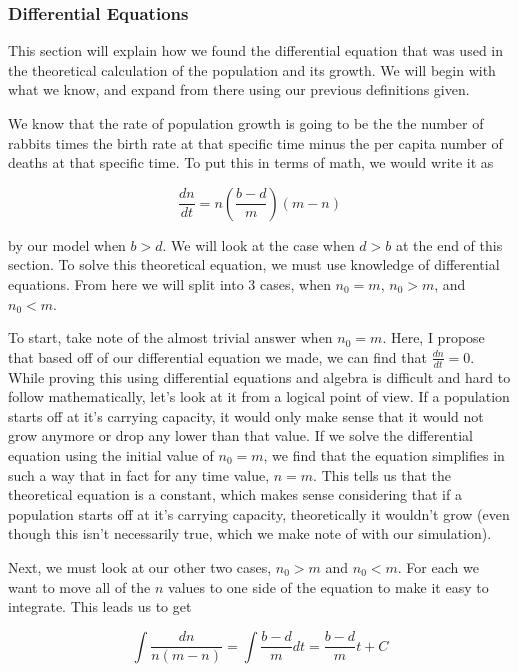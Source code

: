 \documentclass{article}\usepackage[]{graphicx}\usepackage[]{color}
\begin{document}
\subsubsection{Differential Equations}

This section will explain how we found the differential equation that was used in the theoretical calculation of the population and its growth. We will begin with what we know, and expand from there using our previous definitions given.

We know that the rate of population growth is going to be the the number of rabbits times the birth rate at that specific time minus the per capita number of deaths at that specific time. To put this in terms of math, we would write it as

\begin{equation}
\frac{dn}{dt} = n\left(\frac{b-d}{m}\right)(m-n) 
\end{equation}

\noindent by our model when \(b > d\). We will look at the case when \(d > b\) at the end of this section. To solve this theoretical equation, we must use knowledge of differential equations. From here we will split into 3 cases, when \(n_0 =m\), \(n_0 > m\), and \(n_0 < m\). 

To start, take note of the almost trivial answer when \(n_0 = m\). Here, I propose that based off of our differential equation we made, we can find that \(\frac{dn}{dt} = 0\). While proving this using differential equations and algebra is difficult and hard to follow mathematically, let's look at it from a logical point of view. If a population starts off at it's carrying capacity, it would only make sense that it would not grow anymore or drop any lower than that value. If we solve the differential equation using the initial value of \(n_0 = m\), we find that the equation simplifies in such a way that in fact for any time value, \(n=m\). This tells us that the theoretical equation is a constant, which makes sense considering that if a population starts off at it's carrying capacity, theoretically it wouldn't grow (even though this isn't necessarily true, which we make note of with our simulation).

Next, we must look at our other two cases, \(n_0 > m\) and \(n_0 < m\). For each we want to move all of the \(n\) values to one side of the equation to make it easy to integrate. This leads us to get 

\begin{equation}
\int \frac{dn}{n(m-n)} = \int \frac{b-d}{m} dt = \frac{b-d}{m} t + C
\end{equation}
\end{document}
